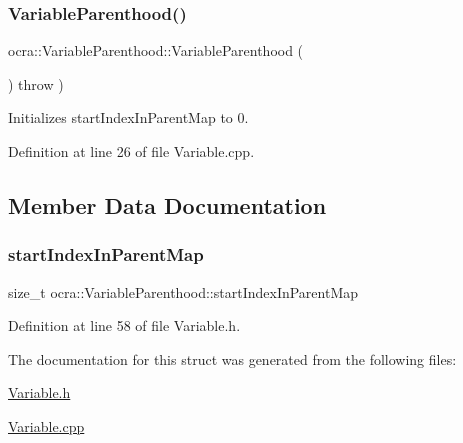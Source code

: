 \subsubsection{\texorpdfstring{Variable\+Parenthood()}{VariableParenthood()}}
{\footnotesize\ttfamily ocra\+::\+Variable\+Parenthood\+::\+Variable\+Parenthood (\begin{DoxyParamCaption}{ }\end{DoxyParamCaption}) throw  ) }



Initializes start\+Index\+In\+Parent\+Map to 0. 



Definition at line 26 of file Variable.\+cpp.



\subsection{Member Data Documentation}
\hypertarget{structocra_1_1VariableParenthood_a94549ed54ec259fda2c6ba07de66937a}{}\label{structocra_1_1VariableParenthood_a94549ed54ec259fda2c6ba07de66937a} 
\subsubsection{\texorpdfstring{start\+Index\+In\+Parent\+Map}{startIndexInParentMap}}
{\footnotesize\ttfamily size\+\_\+t ocra\+::\+Variable\+Parenthood\+::start\+Index\+In\+Parent\+Map}



Definition at line 58 of file Variable.\+h.



The documentation for this struct was generated from the following files\+:\begin{DoxyCompactItemize}
\item 
\hyperlink{Variable_8h}{Variable.\+h}\item 
\hyperlink{Variable_8cpp}{Variable.\+cpp}\end{DoxyCompactItemize}
